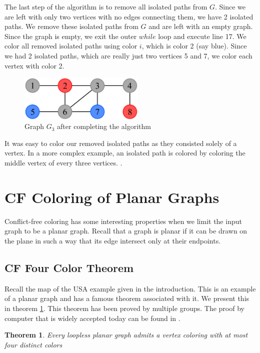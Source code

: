 \documentclass{sig-alternate}
\newtheorem{theorem}{Theorem}
\begin{document}
The last step of the algorithm is to remove all isolated paths from $G$. Since we are left with only two vertices with no edges connecting them, we have 2 isolated paths. We remove these isolated paths from $G$ and are left with an empty graph. Since the graph is empty, we exit the outer $while$ loop and execute line 17. We color all removed isolated paths using color $i$, which is color 2 (say blue). Since we had 2 isolated paths, which are really just two vertices 5 and 7, we color each vertex with color 2.

\begin{figure}[h]
	\centering
	\includegraphics[width=6cm]{../figures/algorithm1-step3.pdf}
	\caption{Graph $G_3$ after completing the algorithm}\label{fig:algorithm1-step3}
\end{figure}

It was easy to color our removed isolated paths as they consisted solely of a vertex. In a more complex example, an isolated path is colored by coloring the middle vertex of every three vertices. \cite{abel2017three}.

\section{CF Coloring of Planar Graphs}
Conflict-free coloring has some interesting properties when we limit the input graph to be a planar graph. Recall that a graph is planar if it can be drawn on the plane in such a way that its edge intersect only at their endpoints.

\subsection{CF Four Color Theorem}
Recall the map of the USA example given in the introduction. This is an example of a planar graph and has a famous theorem associated with it. We present this in theorem \ref{thm:four}. This theorem has been proved by multiple groups. The proof by computer that is widely accepted today can be found in \cite{robertson1997four}.

\begin{theorem} \label{thm:four}
Every loopless planar graph admits a vertex coloring with at most four distinct colors
\end{theorem}
\end{document}
